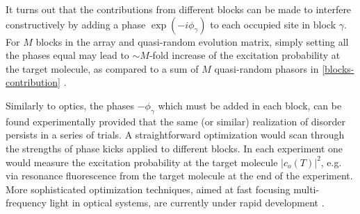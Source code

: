 %
It turns out that the contributions
from different blocks can be made to interfere constructively by adding
 a phase $\exp(-i \phi_{\gamma})$ to each occupied site in block
 $\gamma$. For $M$ blocks in the array and quasi-random evolution matrix, simply setting all the phases equal
 may lead to $\sim M$-fold increase of the excitation probability at the target molecule, as compared to
 a sum of $M$ quasi-random phasors in \autoref{blocks-contribution} \cite{opaque-1}.

Similarly to optics, the phases $-\phi_\gamma$ which must be added in each block, can be found experimentally provided
that the same (or similar) realization of disorder persists in a series of
trials. A straightforward optimization would scan through the
strengths of  phase kicks applied to different blocks. In each
experiment one would measure the excitation probability at the
target molecule $|c_o(T)|^2$, e.g. via resonance fluorescence from
the target molecule at the end of the experiment. More
sophisticated optimization techniques, aimed at fast focusing
multi-frequency light in optical systems, are currently under
rapid development \cite{Gigan-TMeasure-PRL10, Mosk-NPhot10, Cizmar-NPhot10, Silberberg-11, Chatel-Focusing-11, Lagendijk-Focusing-11, zhenia-11, cui-11, kim-11}.


